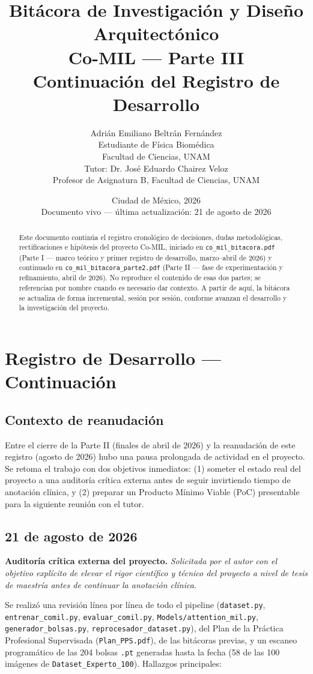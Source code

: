 \documentclass[12pt,letterpaper]{report}
\title{\textbf{Bitácora de Investigación y Diseño Arquitectónico \\ Co-MIL --- Parte III \\[0.3em]
\large Continuación del Registro de Desarrollo}}
\author{Adrián Emiliano Beltrán Fernández \\ \small Estudiante de Física Biomédica \\ \small Facultad de Ciencias, UNAM \\[1em]
\small Tutor: Dr. José Eduardo Chairez Veloz \\ \small Profesor de Asignatura B, Facultad de Ciencias, UNAM}
\date{Ciudad de México, 2026 \\ \small Documento vivo --- última actualización: 21 de agosto de 2026}
\newcommand{\entrada}[2]{%
    \vspace{0.6em}
    \noindent\textbf{#1.} \textit{#2}
    \vspace{0.3em}
    \par
}
\begin{document}
\maketitle

\begin{abstract}
\noindent Este documento continúa el registro cronológico de decisiones, dudas metodológicas,
rectificaciones e hipótesis del proyecto Co-MIL, iniciado en \texttt{co\_mil\_bitacora.pdf}
(Parte I --- marco teórico y primer registro de desarrollo, marzo--abril de 2026) y continuado en
\texttt{co\_mil\_bitacora\_parte2.pdf} (Parte II --- fase de experimentación y refinamiento, abril
de 2026). No reproduce el contenido de esas dos partes; se referencian por nombre cuando es
necesario dar contexto. A partir de aquí, la bitácora se actualiza de forma incremental, sesión por
sesión, conforme avanzan el desarrollo y la investigación del proyecto.
\end{abstract}

\tableofcontents

\chapter{Registro de Desarrollo --- Continuación}

\section{Contexto de reanudación}

Entre el cierre de la Parte II (finales de abril de 2026) y la reanudación de este registro (agosto
de 2026) hubo una pausa prolongada de actividad en el proyecto. Se retoma el trabajo con dos
objetivos inmediatos: (1) someter el estado real del proyecto a una auditoría crítica externa antes
de seguir invirtiendo tiempo de anotación clínica, y (2) preparar un Producto Mínimo Viable (PoC)
presentable para la siguiente reunión con el tutor.

\section{21 de agosto de 2026}

\entrada{Auditoría crítica externa del proyecto}{Solicitada por el autor con el objetivo explícito
de elevar el rigor científico y técnico del proyecto a nivel de tesis de maestría antes de continuar
la anotación clínica.}

Se realizó una revisión línea por línea de todo el pipeline (\texttt{dataset.py},
\texttt{entrenar\_comil.py}, \texttt{evaluar\_comil.py}, \texttt{Models/attention\_mil.py},
\texttt{generador\_bolsas.py}, \texttt{reprocesador\_dataset.py}), del Plan de la Práctica
Profesional Supervisada (\texttt{Plan\_PPS.pdf}), de las bitácoras previas, y un escaneo
programático de las 204 bolsas \texttt{.pt} generadas hasta la fecha (58 de las 100 imágenes de
\texttt{Dataset\_Experto\_100}). Hallazgos principales:
\end{document}
